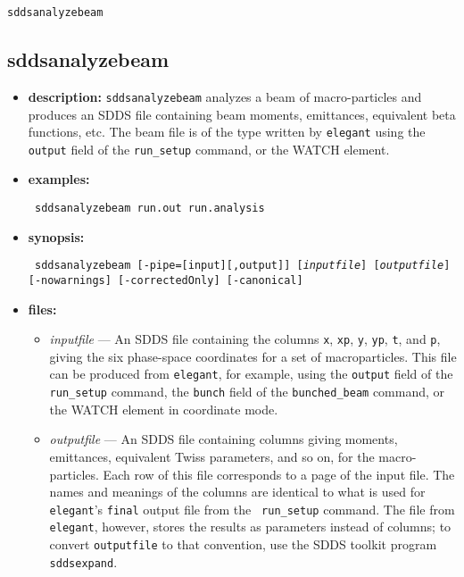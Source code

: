 \documentclass[11pt]{article}
\begin{document}
\newpage
\begin{center}{\Large\verb|sddsanalyzebeam|}\end{center}
\subsection{sddsanalyzebeam}
\label{sddsanalyzebeam}

\begin{itemize}
\item {\bf description:} 
{\tt sddsanalyzebeam} analyzes a beam of macro-particles and produces an SDDS file
containing beam moments, emittances, equivalent beta functions, etc.  The beam file
is of the type written by {\tt elegant} using the {\tt output} field of the {\tt run\_setup}
command, or the WATCH element.

\item {\bf examples:}
\begin{flushleft}{\tt
sddsanalyzebeam run.out run.analysis 
}\end{flushleft}

\item {\bf synopsis:}
\begin{flushleft}{\tt
sddsanalyzebeam [-pipe=[input][,output]] [{\em inputfile}] [{\em outputfile}]
[-nowarnings] [-correctedOnly] [-canonical]
}\end{flushleft}

\item {\bf files:}
\begin{itemize}
\item {\em inputfile} --- An SDDS file containing the columns {\tt x}, {\tt xp}, {\tt y},
{\tt yp}, {\tt t}, and {\tt p}, giving the six phase-space coordinates for a set of macroparticles.
This file can be produced from {\tt elegant}, for example, using the {\tt output} field of the {\tt run\_setup} 
command, the {\tt bunch} field of the {\tt bunched\_beam} command, or the WATCH element in
coordinate mode.

\item {\em outputfile} --- An SDDS file containing columns giving
moments, emittances, equivalent Twiss parameters, and so on, for the
macro-particles.  Each row of this file corresponds to a page of the
input file.  The names and meanings of the columns are identical to
what is used for {\tt elegant}'s {\tt final} output file from the {\tt
run\_setup} command.  The file from {\tt elegant}, however, stores the
results as parameters instead of columns; to convert {\tt outputfile}
to that convention, use the SDDS toolkit program {\tt sddsexpand}.


\end{itemize}
\end{itemize}
\end{document}
